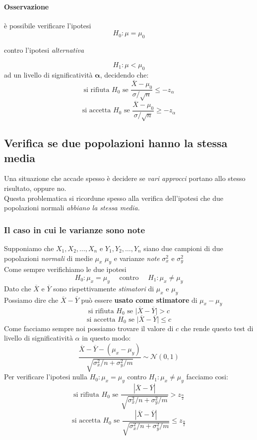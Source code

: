 \documentclass[]{article}
\begin{document}
    \paragraph{Osservazione} è possibile verificare l'ipotesi
    \[ H_0 : \mu = \mu_0 \]
    \centerline{contro l'ipotesi \textit{alternativa}}
    \[ H_1 : \mu < \mu_0 \]
    ad un livello di significatività $\boldsymbol{\alpha}$, decidendo che:
    \[ \text{si rifiuta } H_0 \text{ se } \frac{\overline{X} - \mu_0}{\sigma / \sqrt{n}} \leq -z_\alpha \]
    \[ \text{si accetta } H_0 \text{ se } \frac{\overline{X} - \mu_0}{\sigma / \sqrt{n}} \geq -z_\alpha \]
    \subsection{Verifica se due popolazioni hanno la stessa media}
    Una situazione che accade spesso è decidere se \textit{vari approcci} portano allo stesso risultato, oppure no. \\
    Questa problematica si ricordune spesso alla verifica dell'ipotesi che due popolazioni normali \textit{abbiano la stessa media.}
    \subsubsection{Il caso in cui le varianze sono note}
    Supponiamo che $X_1, X_2, \ldots, X_n$ e $Y_1, Y_2, \ldots, Y_n$ siano due campioni di due popolazioni \textit{normali} di medie $\mu_x$ $\mu_y$ e varianze \textit{note} $\sigma^2_x$ e $\sigma^2_y$ \\
    Come sempre verifichiamo le due ipotesi
    \[ H_0 : \mu_x = \mu_y \quad \text{ contro } \quad H_1 : \mu_x \not = \mu_y \]
    Dato che $\overline{X}$ e $\overline{Y}$ sono rispettivamente \textit{stimatori} di $\mu_x$ e $\mu_y$ \\
    Possiamo dire che $\overline{X} - \overline{Y}$ può essere \textbf{usato come stimatore} di $\mu_x - \mu_y$
    \[ \text{si rifiuta } H_0 \text{ se } \big|\overline{X} - \overline{Y} \big| > c \]
    \[ \text{si accetta } H_0 \text{ se } \big|\overline{X} - \overline{Y} \big| \leq c \]
    Come facciamo sempre noi possiamo trovare il valore di $c$ che rende questo test di livello di significatività $\alpha$ in questo modo:
    \[ \frac{\overline{X} - \overline{Y} - (\mu_x - \mu_y)}{\sqrt{\sigma^2_x / n + \sigma^2_y / m}} \sim \mathcal{N}(0,1) \]
    Per verificare l'ipotesi nulla $H_0 : \mu_x = \mu_y$ contro $H_1 : \mu_x \not = \mu_y$ facciamo cosi:
    \[ \text{si rifiuta } H_0 \text{ se } \frac{|\overline{X} - \overline{Y}|}{\sqrt{\sigma^2_x / n + \sigma^2_y / m}} > z_{\frac{\alpha}{2}} \]
    \[ \text{si accetta } H_0 \text{ se } \frac{|\overline{X} - \overline{Y}|}{\sqrt{\sigma^2_x / n + \sigma^2_y / m}} \leq z_{\frac{\alpha}{2}} \]
\end{document}
